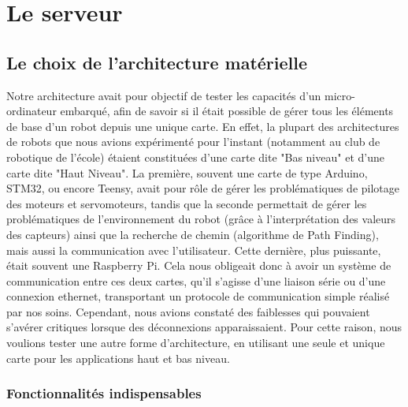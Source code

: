 \documentclass{report}
\begin{document}
    \section{Le serveur}

    \subsection{Le choix de l'architecture matérielle}

    {Notre architecture avait pour objectif de tester les capacités d'un
    micro-ordinateur embarqué, afin de savoir si il était possible de gérer
    tous les éléments de base d'un robot depuis une unique carte. En effet,
    la plupart des architectures de robots que nous avions expérimenté pour l'instant
    (notamment au club de robotique de l'école) étaient constituées d'une carte
    dite "Bas niveau" et d'une carte dite "Haut Niveau". La première, souvent une carte
    de type Arduino, STM32, ou encore Teensy, avait pour rôle de gérer les
    problématiques de pilotage des moteurs et servomoteurs, tandis que la seconde
    permettait de gérer les problématiques de l'environnement du robot (grâce à l'interprétation
    des valeurs des capteurs) ainsi que la recherche de chemin (algorithme de Path Finding),
    mais aussi la communication avec l'utilisateur. Cette dernière, plus puissante,
    était souvent une Raspberry Pi. Cela nous obligeait donc à avoir
    un système de communication entre ces deux cartes, qu'il s'agisse d'une liaison série
    ou d'une connexion ethernet, transportant un protocole de communication simple réalisé
    par nos soins. Cependant, nous avions constaté des faiblesses qui pouvaient s'avérer
    critiques lorsque des déconnexions apparaissaient. Pour cette raison, nous voulions
    tester une autre forme d'architecture, en utilisant une seule et unique carte pour
    les applications haut et bas niveau.}

    \subsubsection{Fonctionnalités indispensables}
\end{document}
